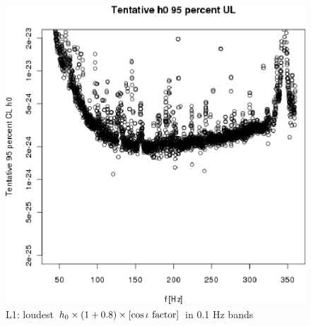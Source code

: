 \begin{figure}
\begin{center}
\includegraphics[width=0.4\paperwidth,height=0.2\paperheight]{plots/h0FullUL95logGuess-L1.eps}
\caption{
L1: loudest $h_0 \times \left( 1 + 0.8 \right) \times \left[\cos \iota \textup{ factor}\right]$ in 0.1 Hz bands}
\end{center}
\end{figure}


